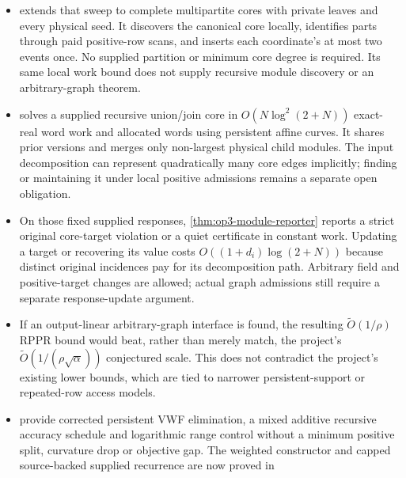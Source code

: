 \documentclass[11pt]{article}
\begin{document}
\begin{itemize}
\cref{thm:op3-local-clique-pendants} solves all clique cores with arbitrary
unequal private pendant counts by a local scalar breakpoint sweep, with
$\widetilde O(1/\epsappr)$ ACL and exact $\widetilde O(1/\rho)$ RPPR work.
This separates a representation obstruction from the graph problem and
motivates simple algebraic core couplings beyond cycle rank.
\item {} extends that sweep to complete
multipartite cores with private leaves and every physical seed. It discovers
the canonical core locally, identifies parts through paid positive-row
scans, and inserts each coordinate's at most two events once. No supplied
partition or minimum core degree is required. Its same local work bound
does not supply recursive module discovery or an arbitrary-graph theorem.
\item {} solves a supplied recursive
union/join core in $O(N\log^2(2+N))$ exact-real word work and allocated
words using persistent affine curves. It shares prior versions and merges
only non-largest physical child modules. The input decomposition can
represent quadratically many core edges implicitly; finding or maintaining
it under local positive admissions remains a separate open obligation.
\item On those fixed supplied responses, \cref{thm:op3-module-reporter}
reports a strict original core-target violation or a quiet certificate in
constant work. Updating a target or recovering its value costs
$O((1+d_i)\log(2+N))$ because distinct original incidences pay for its
decomposition path. Arbitrary field and positive-target changes are allowed;
actual graph admissions still require a separate response-update argument.
\item If an output-linear arbitrary-graph interface is found, the resulting
$\widetilde O(1/\rho)$ RPPR bound would beat, rather than merely match, the
project's $\widetilde O(1/(\rho\sqrt\alpha))$ conjectured scale.  This does not
contradict the project's existing lower bounds, which are tied to narrower
persistent-support or repeated-row access models.
\item {}
provide corrected persistent VWF elimination, a mixed additive recursive
accuracy schedule and logarithmic range control without a minimum positive
split, curvature drop or objective gap. The weighted constructor and capped
source-backed supplied recurrence are now proved in

\end{itemize}
\end{document}
